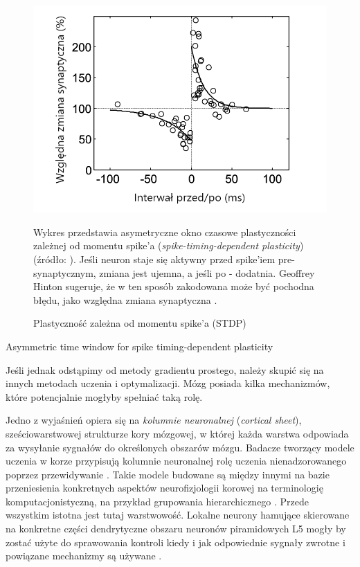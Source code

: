 \begin{figure}[h!]
	\includegraphics[width=\textwidth]{Images/SpikeTimingDependentPlasticity}
	\caption{Plastyczność zależna od momentu spike'a (STDP)}
	Wykres przedstawia asymetryczne okno czasowe plastyczności zależnej od momentu spike'a (\emph{spike-timing-dependent plasticity}) (źródło: \cite{yao2005synaptic}).
	Jeśli neuron staje się aktywny przed spike'iem pre-synaptycznym, zmiana jest ujemna, a jeśli po - dodatnia.
	Geoffrey Hinton sugeruje, że w ten sposób zakodowana może być pochodna błędu, jako względna zmiana synaptyczna \cite{hinton2016can}.
	\label{fig:spike-timing-dependent-plasticity}
\end{figure}

Asymmetric time window for spike timing-dependent plasticity

Jeśli jednak odstąpimy od metody gradientu prostego, należy skupić się na innych metodach uczenia i optymalizacji.
Mózg posiada kilka mechanizmów, które potencjalnie mogłyby spełniać taką rolę.

Jedno z wyjaśnień opiera się na \emph{kolumnie neuronalnej} (\emph{cortical sheet}), sześciowarstwowej strukturze kory mózgowej, w której każda warstwa odpowiada za wysyłanie sygnałów do określonych obszarów mózgu.
Badacze tworzący modele uczenia w korze przypisują kolumnie neuronalnej rolę uczenia nienadzorowanego poprzez przewidywanie \cite{o2014learning}.
Takie modele budowane są między innymi na bazie przeniesienia konkretnych aspektów neurofizjologii korowej na terminologię komputacjonistyczną, na przykład grupowania hierarchicznego \cite{rodriguez2004derivation}.
Przede wszystkim istotna jest tutaj warstwowość.
Lokalne neurony hamujące skierowane na konkretne części dendrytyczne obszaru neuronów piramidowych L5 mogły by zostać użyte do sprawowania kontroli kiedy i jak odpowiednie sygnały zwrotne i powiązane mechanizmy są używane \cite{marblestone2016toward}.

